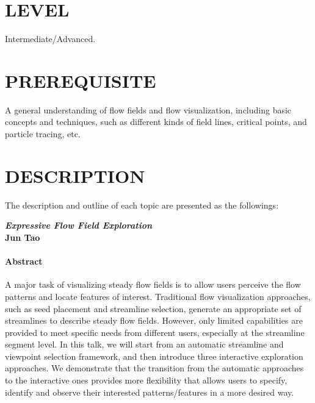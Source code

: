 \documentclass[preprint,journal]{vgtc}       %
\newcommand{\addverticalspace}{\vspace{3mm}}
\begin{document}
\section*{LEVEL}
Intermediate/Advanced.

\section*{PREREQUISITE}
A general understanding of flow fields and flow visualization, including basic concepts and techniques, such as different kinds of field lines, critical points, and particle tracing, etc.


\section*{DESCRIPTION}
The description and outline of each topic are presented as the followings:

\addverticalspace

\noindent\textbf{\textit{Expressive Flow Field Exploration}}\\
\textbf{Jun Tao}
\paragraph{Abstract}
A major task of visualizing steady flow fields is to allow users perceive the flow patterns and locate features of interest. Traditional flow visualization approaches, such as seed placement and streamline selection, generate an appropriate set of streamlines to describe steady flow fields. However, only limited capabilities are provided to meet specific needs from different users, especially at the streamline segment level. In this talk, we will start from an automatic streamline and viewpoint selection framework, and then introduce three interactive exploration approaches. We demonstrate that the transition from the automatic approaches to the interactive ones provides more flexibility that allows users to specify, identify and observe their interested patterns/features in a more desired way.

\addverticalspace
\end{document}
